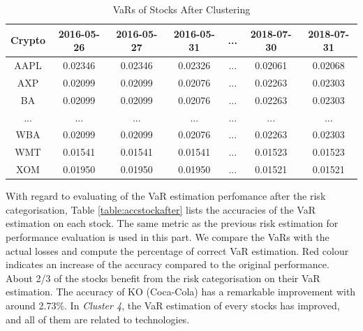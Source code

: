 \documentclass[11pt]{article} %
\theoremstyle{plain}
\theoremstyle{definition}
\begin{document}
{
  \begin{table}[ht]
    \centering
    \small
    \begin{tabular}{|c|c c c c c c|}
        \hline
        Crypto & 2016-05-26 & 2016-05-27 & 2016-05-31 & ... & 2018-07-30 & 2018-07-31 \\ [0.5ex]
        \hline
        AAPL & 0.02346 & 0.02346 & 0.02326 & ... & 0.02061 & 0.02068 \\
        \hline
        AXP & 0.02099 & 0.02099 & 0.02076 & ... & 0.02263 & 0.02303 \\
        \hline
        BA & 0.02099 & 0.02099 & 0.02076 & ... & 0.02263 & 0.02303 \\
        \hline
        ... & ... & ... & ... & ... & ... & ... \\
        \hline
        WBA & 0.02099 & 0.02099 & 0.02076 & ... & 0.02263 & 0.02303 \\
        \hline
        WMT & 0.01541 & 0.01541 & 0.01541 & ... & 0.01523 & 0.01523 \\
        \hline
        XOM & 0.01950 & 0.01950 & 0.01950 & ... & 0.01521 & 0.01521 \\
        \hline
    \end{tabular}
    \caption{VaRs of Stocks After Clustering}
    \label{table:varstockafter}
  \end{table}
}

With regard to evaluating of the VaR estimation perfomance after the risk categorisation, Table \ref{table:accstockafter} lists the accuracies of the VaR estimation on each stock. The same metric as the previous risk estimation for performance evaluation is used in this part. We compare the VaRs with the actual losses and compute the percentage of correct VaR estimation. Red colour indicates an increase of the accuracy compared to the original performance. About 2/3 of the stocks benefit from the risk categorisation on their VaR estimation. The accuracy of KO (Coca-Cola) has a remarkable improvement with around 2.73\%. In \textsl{Cluster 4}, the VaR estimation of every stocks has improved, and all of them are related to technologies.
\end{document}
